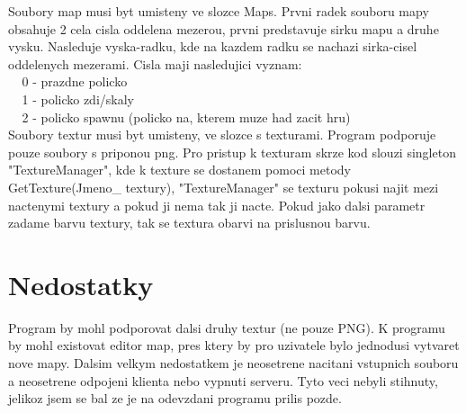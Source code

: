 \documentclass{article}
\newcommand{\s}{$~~~~~$}
\begin{document}
Soubory map musi byt umisteny ve slozce Maps. Prvni radek souboru mapy obsahuje 2 cela cisla oddelena mezerou, prvni predstavuje sirku mapu a druhe vysku. Nasleduje vyska-radku, kde na kazdem radku se nachazi sirka-cisel oddelenych mezerami. Cisla maji nasledujici vyznam:\\
\s 0 - prazdne policko\\
\s 1 - policko zdi/skaly\\
\s 2 - policko spawnu (policko na, kterem muze had zacit hru)\\

Soubory textur musi byt umisteny, ve slozce s texturami. Program podporuje pouze soubory s priponou png. Pro pristup k texturam skrze kod slouzi singleton "TextureManager", kde k texture se dostanem pomoci metody GetTexture(Jmeno\_ textury), "TextureManager" se texturu pokusi najit mezi nactenymi textury a pokud ji nema tak ji nacte. Pokud jako dalsi parametr zadame barvu textury, tak se textura obarvi na prislusnou barvu.

\section*{Nedostatky}
Program by mohl podporovat dalsi druhy textur (ne pouze PNG). K programu by mohl existovat editor map, pres ktery by pro uzivatele bylo jednodusi vytvaret nove mapy. Dalsim velkym nedostatkem je neosetrene nacitani vstupnich souboru a neosetrene odpojeni klienta nebo vypnuti serveru. Tyto veci nebyli stihnuty, jelikoz jsem se bal ze je na odevzdani programu prilis pozde.
\end{document}
